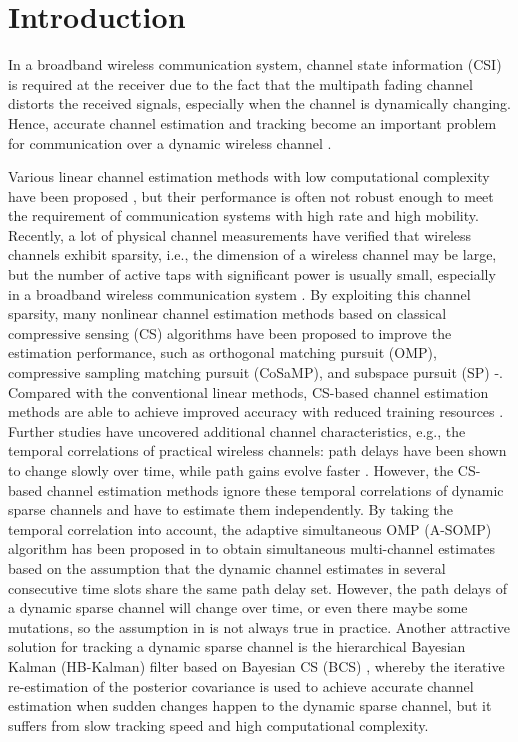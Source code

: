 \documentclass[conference]{IEEEtran}
\begin{document}
\IEEEpeerreviewmaketitle

\section{Introduction}
In a broadband wireless communication system, channel state information (CSI) is required at the receiver due to the fact that the multipath fading channel distorts the received signals, especially when the channel is dynamically changing. Hence, accurate channel estimation and tracking become an important problem for communication over a dynamic wireless channel \cite{CEhistory}.

Various linear channel estimation methods with low computational complexity have been proposed \cite{lce}, but their performance is often not robust enough to meet the requirement of communication systems with high rate and high mobility.
Recently, a lot of physical channel measurements have verified that wireless channels exhibit sparsity, i.e., the dimension of a wireless channel may be large, but the number of active taps with significant power is usually small, especially in a broadband wireless communication system \cite{sparse1}.
By exploiting this channel sparsity, many nonlinear channel estimation methods based on classical compressive sensing (CS) algorithms have been proposed to improve the estimation performance, such as orthogonal matching pursuit (OMP), compressive sampling matching pursuit (CoSaMP), and subspace pursuit (SP) \cite{CSCE}-\cite{GG2}.
Compared with the conventional linear methods, CS-based channel estimation methods are able to achieve improved accuracy with reduced training resources \cite{CSCE}.
Further studies have uncovered additional channel characteristics, e.g., the temporal correlations of practical wireless channels: path delays have been shown to change slowly over time, while path gains evolve faster \cite{dynamic2}. %
However, the CS-based channel estimation methods ignore these temporal correlations of dynamic sparse channels and have to estimate them independently.
By taking the temporal correlation into account, the adaptive simultaneous OMP (A-SOMP) algorithm has been proposed in \cite{A-SOMP} to obtain simultaneous multi-channel estimates based on the assumption that the dynamic channel estimates in several consecutive time slots share the same path delay set.
However, the path delays of a dynamic sparse channel will change over time, or even there maybe some mutations, so the assumption in \cite{A-SOMP} is not always true in practice.
Another attractive solution for tracking a dynamic sparse channel is the hierarchical Bayesian Kalman (HB-Kalman) filter based on Bayesian CS (BCS) \cite{HB-Kalman}, whereby the iterative re-estimation of the posterior covariance \cite{BayesianCS} is used to achieve accurate channel estimation when sudden changes happen to the dynamic sparse channel, but it suffers from slow tracking speed and high computational complexity.
\end{document}
